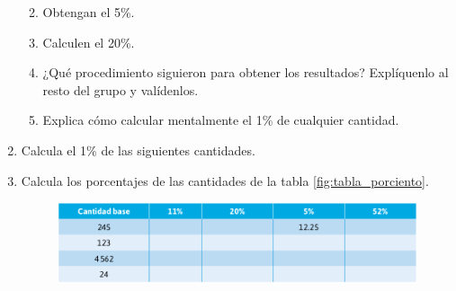 \documentclass[11pt]{book}
\begin{document}
\begin{enumerate}
\begin{enumerate}
          \item Obtengan el 5\%.\\
          \item Calculen el 20\%.\\
          \item ¿Qué procedimiento siguieron para obtener los resultados? Explíquenlo al resto del grupo y valídenlos.
          \item Explica cómo calcular mentalmente el 1\% de cualquier cantidad.
        \end{enumerate}
  \item Calcula el 1\% de las siguientes cantidades.\\
  \item Calcula los porcentajes de las cantidades de la tabla \ref{fig:tabla_porciento}.
        \begin{figure}[H]
          \centering
          \includegraphics[width=.8\linewidth]{tabla_porciento.png}

\end{figure}
\end{enumerate}
\end{document}
